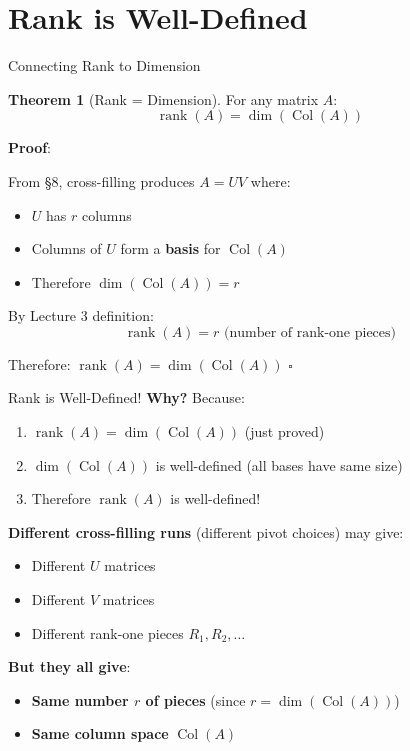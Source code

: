 \documentclass[10pt]{beamer}
\theoremstyle{definition}
\newtheorem{thm}{Theorem}[section]
\newcommand{\x}[1]{\alert{\textbf{#1}}}
\begin{document}
\section{Rank is Well-Defined}

\begin{frame}{Connecting Rank to Dimension}
\begin{thm}[Rank = Dimension]
For any matrix $A$:
$$\operatorname{rank}(A) = \dim(\operatorname{Col}(A))$$
\end{thm}

\vfill
\textbf{Proof}:

From §8, cross-filling produces $A = UV$ where:
\begin{itemize}
\item $U$ has $r$ columns
\item Columns of $U$ form a \x{basis} for $\operatorname{Col}(A)$
\item Therefore $\dim(\operatorname{Col}(A)) = r$
\end{itemize}

\vfill
By Lecture 3 definition:
$$\operatorname{rank}(A) = r \text{ (number of rank-one pieces)}$$

\vfill
Therefore: $\operatorname{rank}(A) = \dim(\operatorname{Col}(A))$ $\square$
\end{frame}

\begin{frame}{Rank is Well-Defined!}
\x{Why?} Because:
\begin{enumerate}
\item $\operatorname{rank}(A) = \dim(\operatorname{Col}(A))$ (just proved)
\item $\dim(\operatorname{Col}(A))$ is well-defined (all bases have same size)
\item Therefore $\operatorname{rank}(A)$ is well-defined!
\end{enumerate}

\vfill
\x{Different cross-filling runs} (different pivot choices) may give:
\begin{itemize}
\item Different $U$ matrices
\item Different $V$ matrices
\item Different rank-one pieces $R_1, R_2, \ldots$
\end{itemize}

\vfill
\x{But they all give}:
\begin{itemize}
\item \x{Same number $r$ of pieces} (since $r = \dim(\operatorname{Col}(A))$)
\item \x{Same column space} $\operatorname{Col}(A)$
\end{itemize}
\end{frame}
\end{document}
